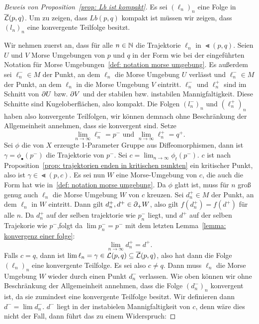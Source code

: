 \begin{proof}[Beweis von Proposition~\ref{prop: Lb ist kompakt}]
    Es sei $(\ell_n)_n$ eine Folge in ${\overline{\mathcal{L}} } (p, q)$. Um zu zeigen, dass $Lb (p, q)$ kompakt ist
    müssen wir zeigen, dass $(l_n)_n$ eine konvergente Teilfolge besitzt.

    Wir nehmen zuerst an, dass für alle $n \in { \mathbb N }$ die Trajektorie $\ell_n$ in $\Lt (p, q)$.
    Seien $U$ und $V$ Morse Umgebungen von $p$ und $q$ in der Form wie bei der eingeführten
    Notation für Morse Umgebungen~\ref{def: notation morse umgebung}.
    Es außerdem sei $\ell_n^- \in M$ der Punkt, an dem $\ell_n$ die Morse Umgebung $U$ verlässt 
    und $\ell_n^- \in M$ der Punkt, an dem $\ell_n$ in die Morse Umgebung $V$ eintritt.
    $\ell_n^-$ und $\ell_n^+$ sind im Schnitt von ${ \partial } U$ bzw. ${ \partial } V$ und der stabilen bzw. 
    instabilen Mannigfaltigkeit. Diese Schnitte sind Kugeloberflächen, also kompakt. Die Folgen 
    $(l_n^-)_n$ und $(\ell_n^+)_n$ haben also konvergente Teilfolgen, wir können demnach ohne 
    Beschränkung der Allgemeinheit annehmen, dass sie konvergent sind. Setze
    \[ \lim_{n \to \infty} \ell_n^- = p^- \text{ und } \lim_{n \to \infty} \ell_n^+ = q^+ . \]
    Sei $\phi$ die von $X$ erzeugte 1-Parameter Gruppe aus Diffeomorphismen, dann ist 
    $\gamma = \phi_{\bullet}(p^-)$ die Trajektorie von $p^-$. Sei 
    $c = \lim_{n \to \infty} \phi_t(p^-)$. $c$ ist nach 
    Proposition~\ref{prop: trajektorien enden in kritischen punkten} ein kritischer Punkt,
    also ist $\gamma \in \Lt (p, c)$. Es sei nun $W$ eine Morse-Umgebung von $c$, die auch
    die Form hat wie in~\ref{def: notation morse umgebung}. Da $\phi$ glatt ist, muss für $n$ 
    groß genug auch $\ell_n$ die Morse Umgebung $W$ von $c$ kreuzen. Sei $d_n^+ \in M$ der Punkt, an
    dem $\ell_n$ in $W$ eintritt. Dann gilt $d_n^+, d^+ \in { \partial }_+ W$, also gilt $f(d_n^+) = f(d^+)$
    für alle $n$. Da $d_n^+$ auf der selben trajektorie wie $p_n^-$ liegt, und $d^+$ auf der selben 
    Trajekorie wie $p^-$,folgt da $\lim p_n^- = p^-$ mit dem letzten 
    Lemma~\ref{lemma: konvergenz einer folge}: 
    \[ \lim_{n \to \infty} d_n^+ = d^+ . \]
    Falls $c = q$, dann ist $\lim \ell_n = \gamma \in { \mathcal{L} } (p, q) \subseteq {\overline{\mathcal{L}} } (p, q)$, also hat 
    dann die Folge $(\ell_n)_n$ eine konvergente Teilfolge. Es sei also $c \neq q$. Dann muss 
    $\ell_n$ die Morse Umgebung $W$ wieder durch einen Punkt $d_n^-$ verlassen. Wie oben können wir 
    ohne Beschränkung der Allgemeinheit annehmen, dass die Folge $(d_n^-)_n$ konvergent ist, da
    sie zumindest eine konvergente Teilfolge besitzt. Wir definieren dann $d^- = \lim d_n^-$. 
    $d^-$ liegt in der instabielen Mannigfaltigkeit von $c$, denn wäre dies nicht der Fall, dann 
    führt das zu einem Widerspruch:
    

\end{proof}
